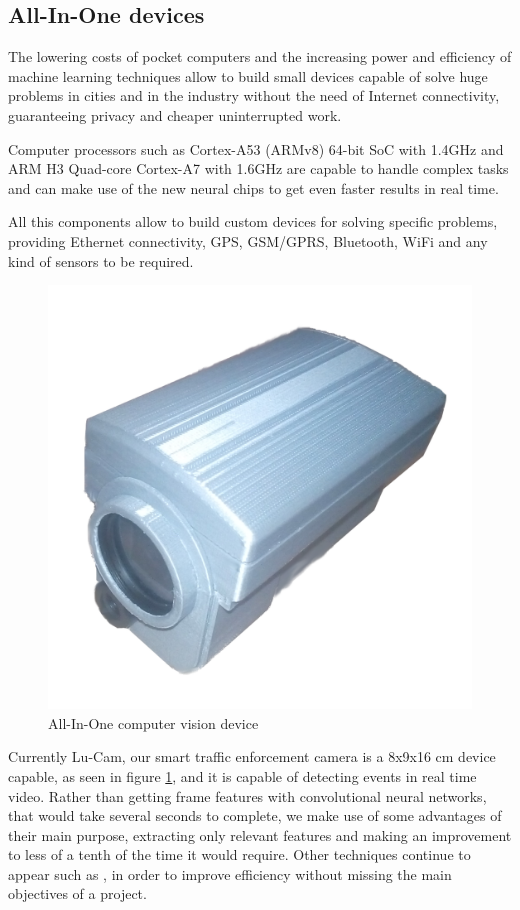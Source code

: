 \documentclass[fleqn,12pt]{SelfArx} %
\begin{document}
\subsection{All-In-One devices}

The lowering costs of pocket computers and the increasing power and efficiency of machine learning techniques allow to build small devices capable of solve huge problems in cities and in the industry without the need of Internet connectivity, guaranteeing privacy and cheaper uninterrupted work.

Computer processors such as Cortex-A53 (ARMv8) 64-bit SoC with 1.4GHz and ARM H3 Quad-core Cortex-A7 with 1.6GHz are capable to handle complex tasks and can make use of the new neural chips to get even faster results in real time.

All this components allow to build custom devices for solving specific problems, providing Ethernet connectivity, GPS, GSM/GPRS, Bluetooth, WiFi and any kind of sensors to be required.

\begin{figure}[t]\centering
	\includegraphics[width=0.8\linewidth]{images/lucam_005}
	\caption{All-In-One computer vision device}
	\label{fig:device}
\end{figure}

Currently Lu-Cam, our smart traffic enforcement camera is a 8x9x16 cm device capable, as seen in figure \ref{fig:device}, and it is capable of detecting events in real time video. Rather than getting frame features with convolutional neural networks, that would take several seconds to complete, we make use of some advantages of their main purpose, extracting only relevant features and making an improvement to less of a tenth of the time it would require. Other techniques continue to appear such as \cite{Cavigelli:2017:CCI:3131885.3131906}, in order to improve efficiency without missing the main objectives of a project.
\end{document}
